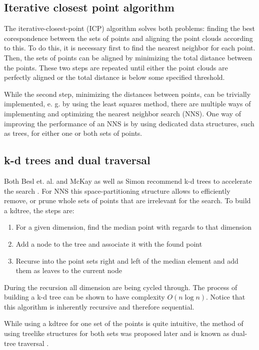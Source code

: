 \documentclass{utue} %
\begin{document}
\subsection{Iterative closest point algorithm}
The iterative-closest-point (ICP) algorithm solves both problems: finding the best corespondence between the sets of points and aligning the point clouds according to this. To do this, it is necessary first to find the nearest neighbor for each point. Then, the sets of points can be aligned by minimizing the total distance between the points. These two steps are repeated until either the point clouds are perfectly aligned or the total distance is below some specified threshold.

While the second step, minimizing the distances between points, can be trivially implemented, e. g. by using the least squares method, there are multiple ways of implementing and optimizing the nearest neighbor search (NNS). One way of improving the performance of an NNS is by using dedicated data structures, such as trees, for either one or both sets of points.
\subsection{k-d trees and dual traversal}
Both Besl et. al. and McKay as well as Simon recommend k-d trees to accelerate the search \cite{icp,simon1996fast}. For NNS this space-partitioning structure allows to efficiently remove, or prune whole sets of points that are irrelevant for the search. To build a kdtree, the steps are:
\begin{enumerate}
\item For a given dimension, find the median point with regards to that dimension
\item Add a node to the tree and associate it with the found point
\item Recurse into the point sets right and left of the median element and add them as leaves to the current node
\end{enumerate}
During the recursion all dimension are being cycled through. The process of building a k-d tree can be shown to have complexity $O(n \log n)$. Notice that this algorithm is inherently recursive and therefore sequential.

While using a kdtree for one set of the points is quite intuitive, the method of using treelike structures for both sets was proposed later and is known as dual-tree traversal \cite{firstdual}.\\
\end{document}
